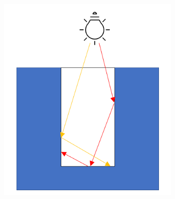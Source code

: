 \begin{figure}[H]
	\centering
	\begin{subfigure}{0.35\textwidth}
		\includegraphics[width=1\linewidth]{res/trench_with_rays.png}
		\caption{}


\end{subfigure}
\end{figure}
